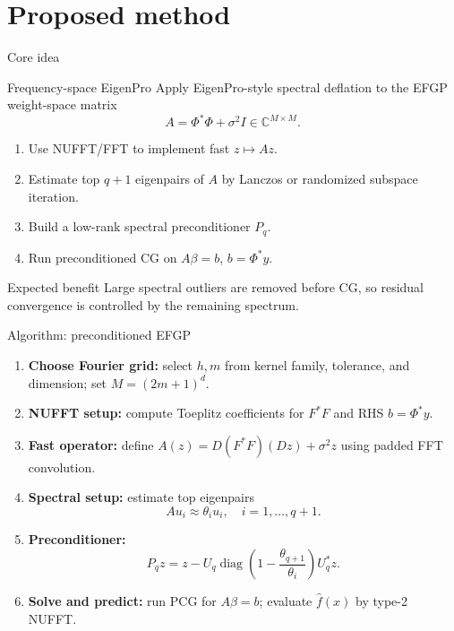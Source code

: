 \documentclass[aspectratio=169,10pt]{beamer}
\newcommand{\C}{\mathbb{C}}
\newcommand{\sig}{\sigma^2}
\begin{document}
\section{Proposed method}

\begin{frame}{Core idea}
\begin{block}{Frequency-space EigenPro}
Apply EigenPro-style spectral deflation to the EFGP weight-space matrix
\[
A = \Phi^*\Phi+\sig I\in\C^{M\times M}.
\]
\end{block}

\begin{enumerate}
  \item Use NUFFT/FFT to implement fast $z\mapsto Az$.
  \item Estimate top $q+1$ eigenpairs of $A$ by Lanczos or randomized subspace iteration.
  \item Build a low-rank spectral preconditioner $P_q$.
  \item Run preconditioned CG on $A\beta=b$, $b=\Phi^*y$.
\end{enumerate}

\begin{block}{Expected benefit}
Large spectral outliers are removed before CG, so residual convergence is controlled by the remaining spectrum.
\end{block}
\end{frame}

\begin{frame}{Algorithm: preconditioned EFGP}
\small
\begin{enumerate}
  \item \textbf{Choose Fourier grid:} select $h,m$ from kernel family, tolerance, and dimension; set $M=(2m+1)^d$.
  \item \textbf{NUFFT setup:} compute Toeplitz coefficients for $F^*F$ and RHS $b=\Phi^*y$.
  \item \textbf{Fast operator:} define $A(z)=D(F^*F)(Dz)+\sig z$ using padded FFT convolution.
  \item \textbf{Spectral setup:} estimate top eigenpairs
  \[
  A u_i \approx \theta_i u_i,
  \quad i=1,\dots,q+1.
  \]
  \item \textbf{Preconditioner:}
  \[
  P_q z=z-U_q\operatorname{diag}\!\left(1-\frac{\theta_{q+1}}{\theta_i}\right)U_q^*z.
  \]
  \item \textbf{Solve and predict:} run PCG for $A\beta=b$; evaluate $\hat f(x)$ by type-2 NUFFT.
\end{enumerate}
\end{frame}
\end{document}
